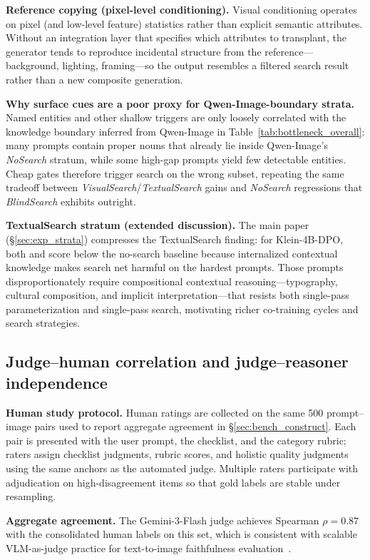 \textbf{Reference copying (pixel-level conditioning).}
Visual conditioning operates on pixel (and low-level feature) statistics rather
than explicit semantic attributes. Without an integration layer that specifies
which attributes to transplant, the generator tends to reproduce incidental
structure from the reference---background, lighting, framing---so the output
resembles a filtered search result rather than a new composite generation.

\textbf{Why surface cues are a poor proxy for Qwen-Image-boundary strata.}
Named entities and other shallow triggers are only loosely correlated with
the knowledge boundary inferred from Qwen-Image in Table~\ref{tab:bottleneck_overall}: many
prompts contain proper nouns that already lie inside Qwen-Image's \emph{NoSearch}
stratum, while some high-gap prompts yield few detectable entities. Cheap
gates therefore trigger search on the wrong subset, repeating the same
tradeoff between \emph{VisualSearch}/\emph{TextualSearch} gains and
\emph{NoSearch} regressions that \emph{BlindSearch} exhibits outright.

\textbf{TextualSearch stratum (extended discussion).}
The main paper (\S\ref{sec:exp_strata}) compresses the TextualSearch finding: for Klein-4B-DPO, both \CondGS and \CondGAS score below the no-search baseline because internalized contextual knowledge makes search net harmful on the hardest prompts.
Those prompts disproportionately require compositional contextual reasoning---typography, cultural composition, and implicit interpretation---that resists both single-pass parameterization and single-pass search, motivating richer co-training cycles and search strategies.

\subsection{Judge--human correlation and judge--reasoner independence}
\label{app:eval_correlation}

\textbf{Human study protocol.}
Human ratings are collected on the same 500 prompt--image pairs used to report aggregate agreement in \S\ref{sec:bench_construct}.
Each pair is presented with the user prompt, the checklist, and the category rubric; raters assign checklist judgments, rubric scores, and holistic quality judgments using the same anchors as the automated judge.
Multiple raters participate with adjudication on high-disagreement items so that gold labels are stable under resampling.

\textbf{Aggregate agreement.}
The Gemini-3-Flash judge achieves Spearman $\rho = 0.87$ with the consolidated human labels on this set, which is consistent with scalable VLM-as-judge practice for text-to-image faithfulness evaluation~\cite{hu2023tifa,wiles2024gecko,lee2024heim}.

